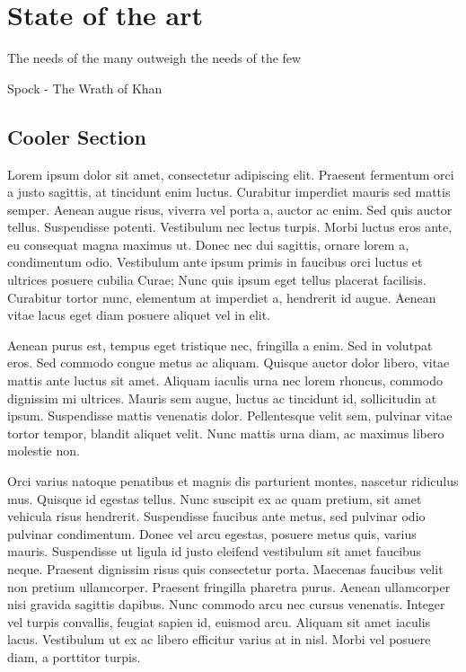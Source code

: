 \chapter{State of the art}

\begin{FraseCelebre}
  \begin{Frase}
    The needs of the many outweigh the needs of the few
  \end{Frase}
  \begin{Fuente}
    Spock - The Wrath of Khan
  \end{Fuente}
\end{FraseCelebre}

\section{Cooler Section}

Lorem ipsum dolor sit amet, consectetur adipiscing elit. Praesent fermentum orci
a justo sagittis, at tincidunt enim luctus. Curabitur imperdiet mauris sed
mattis semper. Aenean augue risus, viverra vel porta a, auctor ac enim. Sed quis
auctor tellus. Suspendisse potenti. Vestibulum nec lectus turpis. Morbi luctus
eros ante, eu consequat magna maximus ut. Donec nec dui sagittis, ornare lorem
a, condimentum odio. Vestibulum ante ipsum primis in faucibus orci luctus et
ultrices posuere cubilia Curae; Nunc quis ipsum eget tellus placerat facilisis.
Curabitur tortor nunc, elementum at imperdiet a, hendrerit id augue. Aenean
vitae lacus eget diam posuere aliquet vel in elit.

Aenean purus est, tempus eget tristique nec, fringilla a enim. Sed in volutpat
eros. Sed commodo congue metus ac aliquam. Quisque auctor dolor libero, vitae
mattis ante luctus sit amet. Aliquam iaculis urna nec lorem rhoncus, commodo
dignissim mi ultrices. Mauris sem augue, luctus ac tincidunt id, sollicitudin at
ipsum. Suspendisse mattis venenatis dolor. Pellentesque velit sem, pulvinar
vitae tortor tempor, blandit aliquet velit. Nunc mattis urna diam, ac maximus
libero molestie non.

Orci varius natoque penatibus et magnis dis parturient montes, nascetur
ridiculus mus. Quisque id egestas tellus. Nunc suscipit ex ac quam pretium, sit
amet vehicula risus hendrerit. Suspendisse faucibus ante metus, sed pulvinar
odio pulvinar condimentum. Donec vel arcu egestas, posuere metus quis, varius
mauris. Suspendisse ut ligula id justo eleifend vestibulum sit amet faucibus
neque. Praesent dignissim risus quis consectetur porta. Maecenas faucibus velit
non pretium ullamcorper. Praesent fringilla pharetra purus. Aenean ullamcorper
nisi gravida sagittis dapibus. Nunc commodo arcu nec cursus venenatis. Integer
vel turpis convallis, feugiat sapien id, euismod arcu. Aliquam sit amet iaculis
lacus. Vestibulum ut ex ac libero efficitur varius at in nisl. Morbi vel posuere
diam, a porttitor turpis.

